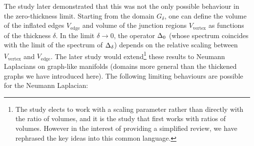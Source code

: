 The study \cite{kuchment2003asymptotics} later demonstrated that this was not the only possible behaviour in the zero-thickness limit.
Starting from the domain $G_{\delta}$, one can define the volume of the inflated edges $V_{\mathrm{edge}}$ and volume of the junction regions $V_{\mathrm{vertex}}$ as functions of the thickness $\delta$.
In the limit $\delta\rightarrow0$, the operator $\Delta_0$ (whose spectrum coincides with the limit of the spectrum of $\Delta_\delta$) depends on the relative scaling between $V_{\mathrm{vertex}}$ and $V_{\mathrm{edge}}$.
The later study \cite{exner2005convergence} would extend\footnote{The study \cite{kuchment2003asymptotics} elects to work with a scaling parameter rather than directly with the ratio of volumes, and it is the study \cite{exner2005convergence} that first works with ratios of volumes. However in the interest of providing a simplified review, we have rephrased the key ideas into this common language.} these results to Neumann Laplacians on graph-like manifolds (domains more general than the thickened graphs we have introduced here).
The following limiting behaviours are possible for the Neumann Laplacian:
